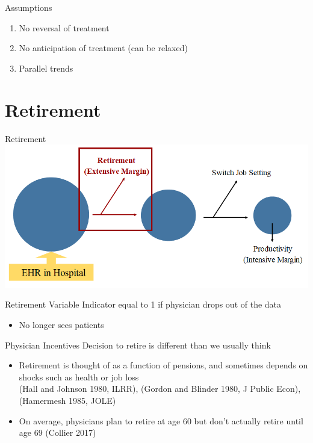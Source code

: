 \documentclass[10pt]{beamer}
\begin{document}
\begin{frame}{Assumptions}
\begin{enumerate}
    \item No reversal of treatment
                \vspace{3mm}
    \item No anticipation of treatment (can be relaxed)
                \vspace{3mm}
    \item Parallel trends
\end{enumerate} 
\end{frame}


\section{Retirement}


\begin{frame}{Retirement}
\centering
\includegraphics[scale=.4]{Objects/EHR_FlowChart_Retire.PNG}
\end{frame}


\begin{frame}{Retirement Variable}
Indicator equal to 1 if physician drops out of the data\\
                    \vspace{3mm}
\begin{itemize}
    \item No longer sees patients
\end{itemize}
\end{frame}

\begin{frame}{Physician Incentives}
Decision to retire is different than we usually think
                \vspace{3mm}
\begin{itemize}
    \item Retirement is thought of as a function of pensions, and sometimes depends on shocks such as health or job loss\\ \scriptsize{(Hall and Johnson 1980, ILRR), (Gordon and Blinder 1980, J Public Econ), (Hamermesh 1985, JOLE)}
                \vspace{3mm}
                \normalsize
    \item On average, physicians plan to retire at age 60 but don't actually retire until age 69 \scriptsize{(Collier 2017)}
\end{itemize}
\end{frame}
\end{document}
